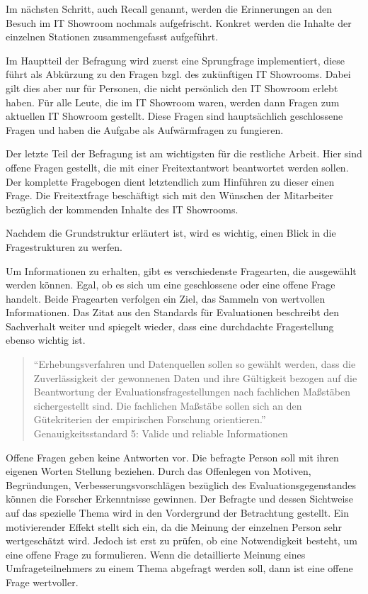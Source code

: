 Im nächsten Schritt, auch Recall genannt, werden die Erinnerungen an den Besuch im IT Showroom nochmals aufgefrischt. 
Konkret werden die Inhalte der einzelnen Stationen zusammengefasst aufgeführt.

Im Hauptteil der Befragung wird zuerst eine Sprungfrage implementiert, diese führt als Abkürzung zu den Fragen bzgl. des zukünftigen IT Showrooms. Dabei gilt dies aber nur für Personen, die nicht persönlich den IT Showroom erlebt haben. 
Für alle Leute, die im IT Showroom waren, werden dann Fragen zum aktuellen IT Showroom gestellt. Diese Fragen sind hauptsächlich geschlossene Fragen und haben die Aufgabe als Aufwärmfragen zu fungieren.

Der letzte Teil der Befragung ist am wichtigsten für die restliche Arbeit. 
Hier sind offene Fragen gestellt, die mit einer Freitextantwort beantwortet werden sollen.
Der komplette Fragebogen dient letztendlich zum Hinführen zu dieser einen Frage.
Die Freitextfrage beschäftigt sich mit den Wünschen der Mitarbeiter bezüglich der kommenden Inhalte des IT Showrooms.


Nachdem die Grundstruktur erläutert ist, wird es wichtig, einen Blick in die Fragestrukturen zu werfen.
 
Um Informationen zu erhalten, gibt es verschiedenste Fragearten, die ausgewählt werden können.
Egal, ob es sich um eine geschlossene oder eine offene Frage handelt\autocite[S.31]{2009Fragebogen}. %
Beide Fragearten verfolgen ein Ziel, das Sammeln von wertvollen Informationen.
Das Zitat aus den Standards für Evaluationen beschreibt den Sachverhalt weiter und spiegelt wieder, dass eine durchdachte Fragestellung ebenso wichtig ist.

\begin{quote} \enquote{Erhebungsverfahren und Datenquellen sollen so gewählt werden, dass die Zuverlässigkeit der gewonnenen Daten und ihre Gültigkeit bezogen auf die Beantwortung der Evaluationsfragestellungen nach fachlichen Maßstäben sichergestellt sind. Die fachlichen Maßstäbe sollen sich an den Gütekriterien der empirischen Forschung orientieren.} Genauigkeitsstandard 5: Valide und reliable Informationen\autocite{DegEval} %
\end{quote}

Offene Fragen geben keine Antworten vor. Die befragte Person soll mit ihren eigenen Worten Stellung beziehen.
Durch das Offenlegen von Motiven, Begründungen, Verbesserungsvorschlägen bezüglich des Evaluationsgegenstandes können die Forscher Erkenntnisse gewinnen.
Der Befragte und dessen Sichtweise auf das spezielle Thema wird in den Vordergrund der Betrachtung gestellt\autocite[S.31]{2009Fragebogen}. %
Ein motivierender Effekt stellt sich ein, da die Meinung der einzelnen Person sehr wertgeschätzt wird. 
Jedoch ist erst zu prüfen, ob eine Notwendigkeit besteht, um eine offene Frage zu formulieren. 
Wenn die detaillierte Meinung eines Umfrageteilnehmers zu einem Thema abgefragt werden soll, dann ist eine offene Frage wertvoller. 
 

